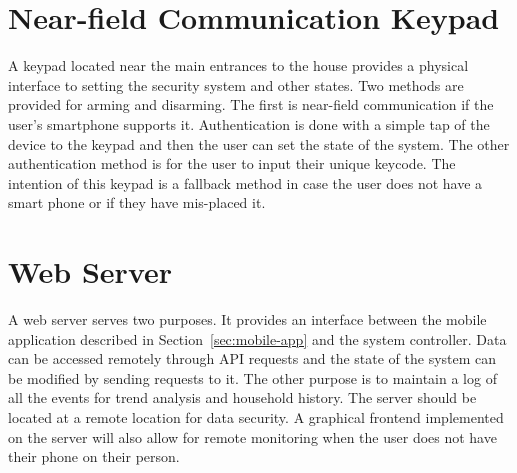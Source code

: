 \documentclass{report}
\begin{document}
\section{Near-field Communication Keypad}
A keypad located near the main entrances to the house provides a physical
interface to setting the security system and other states. Two methods are
provided for arming and disarming. The first is near-field communication if the
user's smartphone supports it. Authentication is done with a simple tap of the
device to the keypad and then the user can set the state of the system. The
other authentication method is for the user to input their unique keycode. The
intention of this keypad is a fallback method in case the user does not have a
smart phone or if they have mis-placed it.

\section{Web Server}
\label{sec:web-server}
A web server serves two purposes. It provides an interface between the mobile
application described in Section~\ref{sec:mobile-app} and the system
controller. Data can be accessed remotely through API requests and the state of
the system can be modified by sending requests to it. The other purpose is to
maintain a log of all the events for trend analysis and household history. The
server should be located at a remote location for data security.  A graphical
frontend implemented on the server will also allow for remote monitoring when
the user does not have their phone on their person. 
\end{document}
